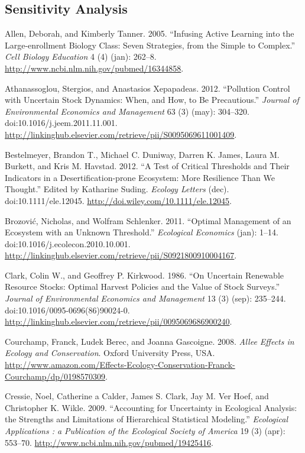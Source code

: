 \documentclass[author-year, review]{elsarticle} %
\begin{document}
\subsection{Sensitivity Analysis}\label{sensitivity-analysis}

Allen, Deborah, and Kimberly Tanner. 2005. ``Infusing Active Learning
into the Large-enrollment Biology Class: Seven Strategies, from the
Simple to Complex.'' \emph{Cell Biology Education} 4 (4) (jan): 262--8.
\url{http://www.ncbi.nlm.nih.gov/pubmed/16344858}.

Athanassoglou, Stergios, and Anastasios Xepapadeas. 2012. ``Pollution
Control with Uncertain Stock Dynamics: When, and How, to Be
Precautious.'' \emph{Journal of Environmental Economics and Management}
63 (3) (may): 304--320. doi:10.1016/j.jeem.2011.11.001.
\url{http://linkinghub.elsevier.com/retrieve/pii/S0095069611001409}.

Bestelmeyer, Brandon T., Michael C. Duniway, Darren K. James, Laura M.
Burkett, and Kris M. Havstad. 2012. ``A Test of Critical Thresholds and
Their Indicators in a Desertification-prone Ecosystem: More Resilience
Than We Thought.'' Edited by Katharine Suding. \emph{Ecology Letters}
(dec). doi:10.1111/ele.12045.
\url{http://doi.wiley.com/10.1111/ele.12045}.

Brozović, Nicholas, and Wolfram Schlenker. 2011. ``Optimal Management of
an Ecosystem with an Unknown Threshold.'' \emph{Ecological Economics}
(jan): 1--14. doi:10.1016/j.ecolecon.2010.10.001.
\url{http://linkinghub.elsevier.com/retrieve/pii/S0921800910004167}.

Clark, Colin W., and Geoffrey P. Kirkwood. 1986. ``On Uncertain
Renewable Resource Stocks: Optimal Harvest Policies and the Value of
Stock Surveys.'' \emph{Journal of Environmental Economics and
Management} 13 (3) (sep): 235--244. doi:10.1016/0095-0696(86)90024-0.
\url{http://linkinghub.elsevier.com/retrieve/pii/0095069686900240}.

Courchamp, Franck, Ludek Berec, and Joanna Gascoigne. 2008. \emph{Allee
Effects in Ecology and Conservation}. Oxford University Press, USA.
\url{http://www.amazon.com/Effects-Ecology-Conservation-Franck-Courchamp/dp/0198570309}.

Cressie, Noel, Catherine a Calder, James S. Clark, Jay M. Ver Hoef, and
Christopher K. Wikle. 2009. ``Accounting for Uncertainty in Ecological
Analysis: the Strengths and Limitations of Hierarchical Statistical
Modeling.'' \emph{Ecological Applications : a Publication of the
Ecological Society of America} 19 (3) (apr): 553--70.
\url{http://www.ncbi.nlm.nih.gov/pubmed/19425416}.
\end{document}

